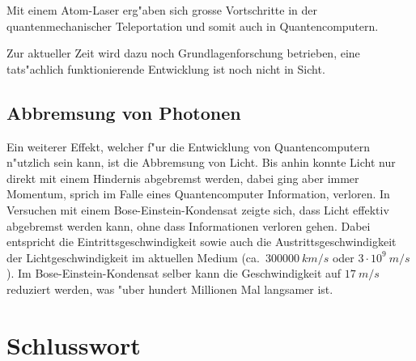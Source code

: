 \begin{refsection}
Mit einem Atom-Laser erg"aben sich grosse Vortschritte in der quantenmechanischer Teleportation und somit auch in Quantencomputern.

Zur aktueller Zeit wird dazu noch Grundlagenforschung betrieben, eine tats"achlich funktionierende Entwicklung ist noch nicht in Sicht. 

\subsection{Abbremsung von Photonen}

Ein weiterer Effekt, welcher f"ur die Entwicklung von Quantencomputern n"utzlich sein kann, ist die Abbremsung von Licht. Bis anhin konnte Licht nur direkt mit einem Hindernis abgebremst werden, dabei ging aber immer Momentum, sprich im Falle eines Quantencomputer Information, verloren. In Versuchen mit einem Bose-Einstein-Kondensat zeigte sich, dass Licht effektiv abgebremst werden kann, ohne dass Informationen verloren gehen. Dabei entspricht die Eintrittsgeschwindigkeit sowie auch die Austrittsgeschwindigkeit der Lichtgeschwindigkeit im aktuellen Medium (ca.~$300000~km/s$ oder $3 \cdot 10^9~ m/s$). Im Bose-Einstein-Kondensat selber kann die Geschwindigkeit auf $17~m/s$ reduziert werden, was "uber hundert Millionen Mal langsamer ist. \cite{bose:SlowLight}

\section{Schlusswort}

\printbibliography[heading=subbibliography]
\end{refsection}



